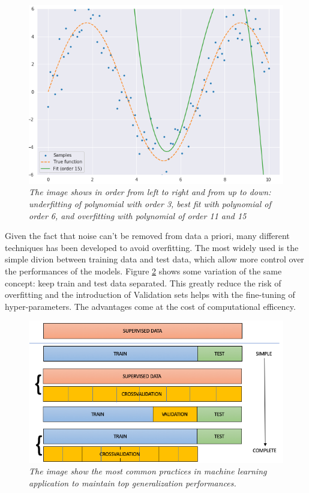 \documentclass[11pt,a4paper]{article}
\begin{document}
\begin{figure}[H]
 \includegraphics[scale=0.35]{../images/fit_nlinear_order15.png}
 \caption{\textit{The image shows in order from left to right and from up to down: underfitting of polynomial with order 3, best fit with polynomial of order 6, and overfitting with polynomial of order 11 and 15}}  
 \label{polyfit}
 
\end{figure}


Given the fact that noise can't be removed from data a priori, many different techniques has been developed to avoid overfitting. 
The most widely used is the simple divion between training data and test data, which allow more control over the performances of the models. Figure \ref{scheme} shows some variation of the same concept: keep train and test data separated.
This greatly reduce the risk of overfitting and the introduction of Validation sets helps with the fine-tuning of hyper-parameters. 
The advantages come at the cost of computational efficency.

\begin{figure}[H]

 \centering
 \includegraphics[scale=0.5]{../images/test_train_process.png}
 \caption{\textit{The image show the most common practices in machine learning application to maintain top generalization performances.}}  
 \label{scheme}
 
\end{figure}
\end{document}
